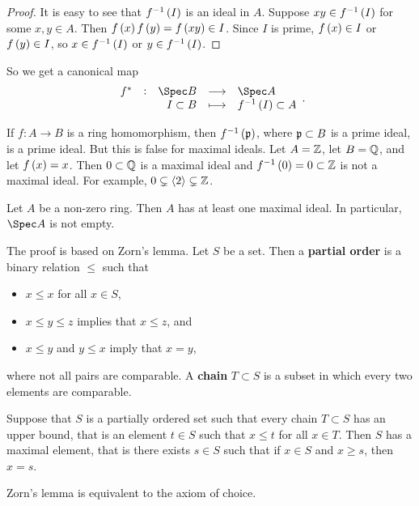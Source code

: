 \begin{proof}
It is easy to see that $ f^{-1}\br{I} $ is an ideal in $ A $. Suppose $ xy \in f^{-1}\br{I} $ for some $ x, y \in A $. Then $ f\br{x}f\br{y} = f\br{xy} \in I $. Since $ I $ is prime, $ f\br{x} \in I $ or $ f\br{y} \in I $, so $ x \in f^{-1}\br{I} $ or $ y \in f^{-1}\br{I} $.
\end{proof}

So we get a canonical map
$$ \function[f^*]{\Spec B}{\Spec A}{I \subset B}{f^{-1}\br{I} \subset A}. $$


\begin{remark}
If $ f : A \to B $ is a ring homomorphism, then $ f^{-1}\br{\ppp} $, where $ \mathfrak{p} \subset B $ is a prime ideal, is a prime ideal. But this is false for maximal ideals. Let $ A = \mathbb{Z} $, let $ B = \mathbb{Q} $, and let $ f\br{x} = x $. Then $ 0 \subset \mathbb{Q} $ is a maximal ideal and $ f^{-1}\br{0} = 0 \subset \ZZ $ is not a maximal ideal. For example, $ 0 \subsetneq \left\langle 2 \right\rangle \subsetneq \mathbb{Z} $.
\end{remark}

\begin{theorem}
\label{thm:4.6}
Let $ A $ be a non-zero ring. Then $ A $ has at least one maximal ideal. In particular, $ \Spec A $ is not empty.
\end{theorem}

The proof is based on Zorn's lemma. Let $ S $ be a set. Then a \textbf{partial order} is a binary relation $ \le $ such that
\begin{itemize}
\item $ x \le x $ for all $ x \in S $,
\item $ x \le y \le z $ implies that $ x \le z $, and
\item $ x \le y $ and $ y \le x $ imply that $ x = y $,
\end{itemize}
where not all pairs are comparable. A \textbf{chain} $ T \subset S $ is a subset in which every two elements are comparable.

\begin{lemma}[Zorn]
Suppose that $ S $ is a partially ordered set such that every chain $ T \subset S $ has an upper bound, that is an element $ t \in S $ such that $ x \le t $ for all $ x \in T $. Then $ S $ has a maximal element, that is there exists $ s \in S $ such that if $ x \in S $ and $ x \ge s $, then $ x = s $.
\end{lemma}

Zorn's lemma is equivalent to the axiom of choice.

